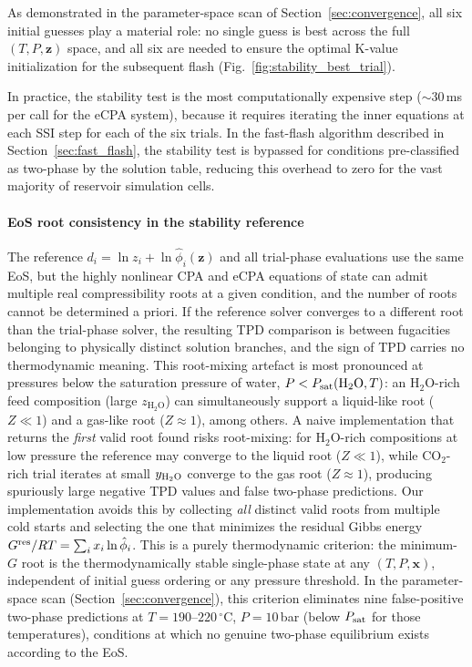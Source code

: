 \documentclass[preprint,12pt,number]{elsarticle}
\begin{document}
As demonstrated in the parameter-space scan of Section~\ref{sec:convergence}, all six
initial guesses play a material role: no single guess is best across the full $(T, P, \mathbf{z})$
space, and all six are needed to ensure the optimal K-value initialization for the
subsequent flash (Fig.~\ref{fig:stability_best_trial}).

In practice, the stability test is the most computationally expensive step ($\sim$30\,ms per
call for the eCPA system), because it requires iterating the inner equations at each SSI step
for each of the six trials.
In the fast-flash algorithm described in Section~\ref{sec:fast_flash}, the stability test is
bypassed for conditions pre-classified as two-phase by the solution table, reducing this
overhead to zero for the vast majority of reservoir simulation cells.

\paragraph{EoS root consistency in the stability reference}
The reference $d_i = \ln z_i + \ln\hat{\phi}_i(\mathbf{z})$ and all trial-phase
evaluations use the same EoS, but the highly nonlinear CPA and eCPA equations of
state can admit multiple real compressibility roots at a given condition, and
the number of roots cannot be determined a priori.
If the reference solver converges to a different root than the trial-phase solver,
the resulting TPD comparison is between fugacities belonging to physically distinct
solution branches, and the sign of TPD carries no thermodynamic meaning.
This root-mixing artefact is most pronounced at pressures below the saturation
pressure of water, $P < P_{\rm sat}(\mathrm{H}_2\mathrm{O},T)$: an H$_2$O-rich
feed composition (large $z_{\mathrm{H}_2\mathrm{O}}$) can simultaneously support
a liquid-like root ($Z \ll 1$) and a gas-like root ($Z \approx 1$), among others.
A naive implementation that returns the \emph{first} valid root found risks
root-mixing: for H$_2$O-rich compositions at low pressure the reference
may converge to the liquid root ($Z \ll 1$), while CO$_2$-rich trial iterates
at small $y_{\rm H_2O}$ converge to the gas root ($Z \approx 1$), producing
spuriously large negative TPD values and false two-phase predictions.
Our implementation avoids this by collecting \emph{all} distinct valid roots
from multiple cold starts and selecting the one that minimizes the residual
Gibbs energy $G^{\rm res}/RT = \sum_i x_i\ln\hat{\phi}_i$.
This is a purely thermodynamic criterion: the minimum-$G$ root is the
thermodynamically stable single-phase state at any $(T,P,\mathbf{x})$,
independent of initial guess ordering or any pressure threshold.
In the parameter-space scan (Section~\ref{sec:convergence}), this criterion
eliminates nine false-positive two-phase predictions at
$T = 190$--$220\,^\circ$C, $P = 10$\,bar (below $P_{\rm sat}$ for those
temperatures), conditions at which no genuine two-phase equilibrium exists
according to the EoS.
\end{document}
